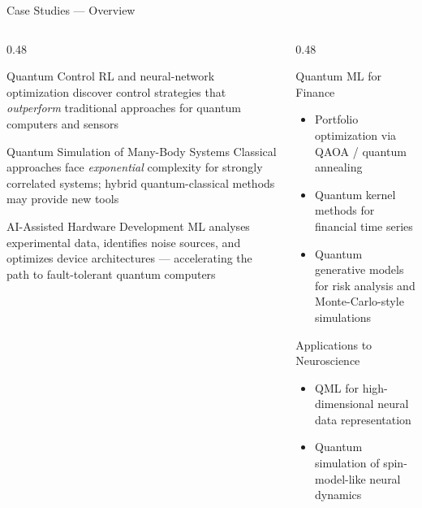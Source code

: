 \documentclass[aspectratio=169]{beamer}
\begin{document}
\begin{frame}{Case Studies — Overview}

  \begin{columns}[T]
    \begin{column}{0.48\textwidth}
      \begin{block}{Quantum Control}
        RL and neural-network optimization discover control strategies
        that \emph{outperform} traditional approaches for quantum
        computers and sensors
      \end{block}
      \medskip
      \begin{block}{Quantum Simulation of Many-Body Systems}
        Classical approaches face \emph{exponential} complexity for
        strongly correlated systems; hybrid quantum-classical methods
        may provide new tools
      \end{block}
      \medskip
      \begin{block}{AI-Assisted Hardware Development}
        ML analyses experimental data, identifies noise sources, and
        optimizes device architectures — accelerating the path to
        fault-tolerant quantum computers
      \end{block}
    \end{column}
    \begin{column}{0.48\textwidth}
      \begin{block}{Quantum ML for Finance}
        \begin{itemize}
          \item Portfolio optimization via QAOA / quantum annealing
          \item Quantum kernel methods for financial time series
          \item Quantum generative models for risk analysis and
                Monte-Carlo-style simulations
        \end{itemize}
      \end{block}
      \medskip
      \begin{block}{Applications to Neuroscience}
        \begin{itemize}
          \item QML for high-dimensional neural data representation
          \item Quantum simulation of spin-model-like neural dynamics
        \end{itemize}
      \end{block}
    \end{column}
  \end{columns}

\end{frame}
\end{document}
